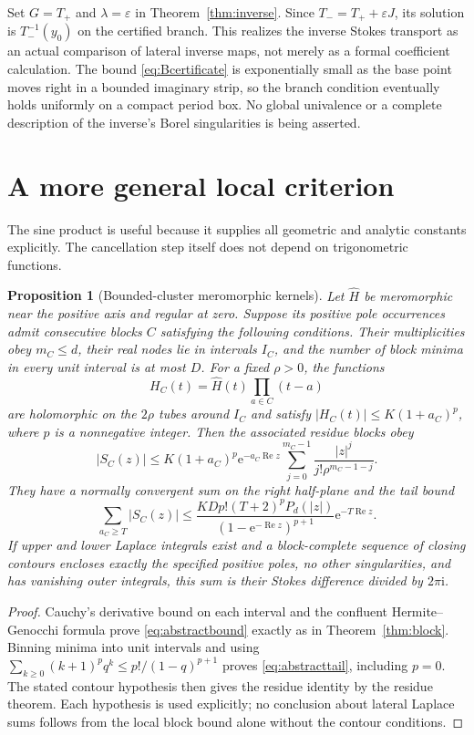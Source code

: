 \documentclass[11pt,a4paper]{article}
\numberwithin{equation}{section}
\newtheorem{proposition}[theorem]{Proposition}
\theoremstyle{definition}
\theoremstyle{remark}
\newcommand{\ii}{\mathrm i}
\newcommand{\e}{\mathrm e}
\newcommand{\re}{\operatorname{Re}}
\begin{document}
Set $G=T_+$ and $\lambda=\varepsilon$ in
Theorem~\ref{thm:inverse}. Since $T_-=T_++\varepsilon J$, its solution is
$T_-^{-1}(y_0)$ on the certified branch. This realizes the inverse Stokes
transport as an actual comparison of lateral inverse maps, not merely
as a formal coefficient calculation. The bound \eqref{eq:Bcertificate}
is exponentially small as the base point moves right in a bounded
imaginary strip, so the branch condition eventually holds uniformly on
a compact period box. No global univalence or a complete description of
the inverse's Borel singularities is being asserted.

\section{A more general local criterion}
\label{sec:abstract}
The sine product is useful because it supplies all geometric and analytic
constants explicitly. The cancellation step itself does not depend on
trigonometric functions.

\begin{proposition}[Bounded-cluster meromorphic kernels]
\label{prop:abstract}
Let $\widehat H$ be meromorphic near the positive axis and regular at
zero. Suppose its positive pole occurrences admit consecutive blocks
$C$ satisfying the following conditions. Their multiplicities obey
$m_C\le d$, their real nodes lie in intervals $I_C$, and the number of
block minima in every unit interval is at most $D$. For a fixed $\rho>0$,
the functions
\[
 H_C(t)=\widehat H(t)\prod_{a\in C}(t-a)
\]
are holomorphic on the $2\rho$ tubes around $I_C$ and satisfy
$|H_C(t)|\le K(1+a_C)^p$, where $p$ is a nonnegative integer.
Then the associated residue blocks obey
\begin{equation}
 |S_C(z)|\le K(1+a_C)^p\e^{-a_C\re z}
       \sum_{j=0}^{m_C-1}\frac{|z|^j}{j!\rho^{m_C-1-j}}.
 \label{eq:abstractbound}
\end{equation}
They have a normally convergent sum on the right half-plane and the tail
bound
\begin{equation}
 \sum_{a_C\ge T}|S_C(z)|\le
 \frac{KDp!(T+2)^pP_d(|z|)}{(1-\e^{-\re z})^{p+1}}
       \e^{-T\re z}.
 \label{eq:abstracttail}
\end{equation}
If upper and lower Laplace integrals exist and a block-complete sequence
of closing contours encloses exactly the specified positive poles, no
other singularities, and has vanishing outer integrals, this sum is their
Stokes difference divided by $2\pi\ii$.
\end{proposition}
\begin{proof}
Cauchy's derivative bound on each interval and the confluent
Hermite--Genocchi formula prove \eqref{eq:abstractbound} exactly as in
Theorem~\ref{thm:block}. Binning minima into unit intervals and using
$\sum_{k\ge0}(k+1)^pq^k\le p!/(1-q)^{p+1}$ proves
\eqref{eq:abstracttail}, including $p=0$. The stated contour hypothesis
then gives the residue identity by the residue theorem. Each hypothesis
is used explicitly; no conclusion about lateral Laplace sums follows
from the local block bound alone without the contour conditions.
\end{proof}
\end{document}
